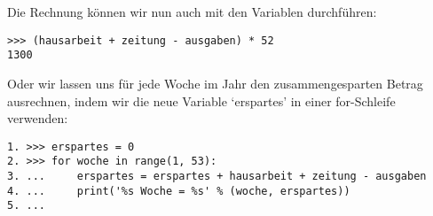 Die Rechnung können wir nun auch mit den Variablen durchführen:

\begin{listing}
\begin{verbatim}
>>> (hausarbeit + zeitung - ausgaben) * 52
1300
\end{verbatim}
\end{listing}

Oder wir lassen uns für jede Woche im Jahr den zusammengesparten Betrag ausrechnen, indem wir die neue Variable `erspartes' in einer for-Schleife verwenden:

\begin{listing}
\begin{verbatim}
1. >>> erspartes = 0
2. >>> for woche in range(1, 53):
3. ...     erspartes = erspartes + hausarbeit + zeitung - ausgaben
4. ...     print('%s Woche = %s' % (woche, erspartes))
5. ...
\end{verbatim}
\end{listing}

